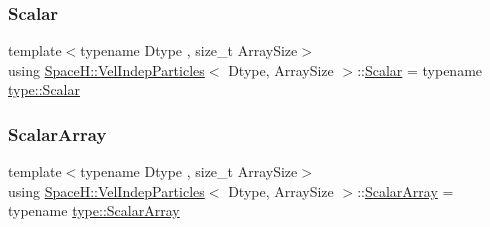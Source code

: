 \mbox{\label{class_space_h_1_1_vel_indep_particles_aeb47d8131b30ed790320ff634f0d6af1}} 
\subsubsection{\texorpdfstring{Scalar}{Scalar}}
{\footnotesize\ttfamily template$<$typename Dtype , size\+\_\+t Array\+Size$>$ \\
using \mbox{\hyperlink{class_space_h_1_1_vel_indep_particles}{Space\+H\+::\+Vel\+Indep\+Particles}}$<$ Dtype, Array\+Size $>$\+::\mbox{\hyperlink{class_space_h_1_1_vel_indep_particles_aeb47d8131b30ed790320ff634f0d6af1}{Scalar}} =  typename \mbox{\hyperlink{struct_space_h_1_1_proto_type_af3c8245d83d9db64749882920de5c274}{type\+::\+Scalar}}}

\mbox{\label{class_space_h_1_1_vel_indep_particles_ab5efeef52fb5748c25fbfeb04b64640e}} 
\subsubsection{\texorpdfstring{Scalar\+Array}{ScalarArray}}
{\footnotesize\ttfamily template$<$typename Dtype , size\+\_\+t Array\+Size$>$ \\
using \mbox{\hyperlink{class_space_h_1_1_vel_indep_particles}{Space\+H\+::\+Vel\+Indep\+Particles}}$<$ Dtype, Array\+Size $>$\+::\mbox{\hyperlink{class_space_h_1_1_vel_indep_particles_ab5efeef52fb5748c25fbfeb04b64640e}{Scalar\+Array}} =  typename \mbox{\hyperlink{struct_space_h_1_1_proto_type_a09ef91dc8a37a044c403f5a833044725}{type\+::\+Scalar\+Array}}}

\mbox{\label{class_space_h_1_1_vel_indep_particles_abca40159a816385790d5a6fd19c1dc6d}} 
